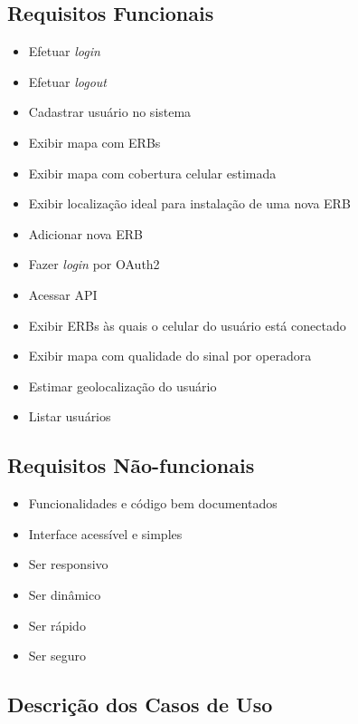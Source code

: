 \documentclass[]{politex}
\begin{document}
\subsection{Requisitos Funcionais}
\begin{itemize}
\item Efetuar \textit{login}
\item Efetuar \textit{logout}
\item Cadastrar usuário no sistema
\item Exibir mapa com ERBs
\item Exibir mapa com cobertura celular estimada
\item Exibir localização ideal para instalação de uma nova ERB
\item Adicionar nova ERB
\item Fazer \textit{login} por OAuth2
\item Acessar API
\item Exibir ERBs às quais o celular do usuário está conectado
\item Exibir mapa com qualidade do sinal por operadora
\item Estimar geolocalização do usuário
\item Listar usuários
\end{itemize}

\subsection{Requisitos Não-funcionais}
\begin{itemize}
\item Funcionalidades e código bem documentados
\item Interface acessível e simples
\item Ser responsivo
\item Ser dinâmico
\item Ser rápido
\item Ser seguro
\end{itemize}

\subsection{Descrição dos Casos de Uso}
\end{document}
